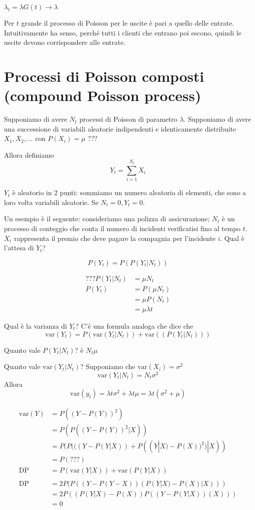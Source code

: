 \documentclass[a4paper,12pt]{book}
\begin{document}
$ \lambda_t = \lambda G(t) \to \lambda $

Per $ t $ grande il processo di Poisson per le uscite è pari a quello delle entrate. Intuitivamente ha senso, perché tutti i clienti che entrano poi escono, quindi le uscite devono corrispondere alle entrate. 

\section{Processi di Poisson composti (compound Poisson process)}
Supponiamo di avere $ N_t $ processi di Poisson di parametro $\lambda$. Supponiamo di avere una successione di variabili aleatorie indipendenti e identicamente distribuite $ X_1, X_2, ... $ con $ P(X_i) = \mu $ ??? %

Allora definiamo
$$ Y_t = \sum_{i = 1}^{N_t} X_i $$

$ Y_t $ è aleatorio in 2 punti: sommiamo un numero aleatorio di elementi, che sono a loro volta variabili aleatorie. Se $ N_t = 0, Y_t = 0 $.

Un esempio è il seguente: consideriamo una polizza di assicurazione; $ N_t $ è un processo di conteggio che conta il numero di incidenti verificatisi fino al tempo $ t $. $ X_i $ rappresenta il premio che deve pagare la compagnia per l'incidente $ i $. Qual è l'attesa di $ Y_t $?

$$ P(Y_t) = P(P(Y_t | N_t )) $$

\begin{align*}
	??? P(Y_t | N_t) & = \mu N_t \\ %
	P(Y_t) & = P(\mu N_t) \\
	& = \mu P(N_t) \\
	& = \mu \lambda t
\end{align*}

Qual è la varianza di $ Y_t $? C'è una formula analoga che dice che 
$$ \text{var} (Y_t) = P(\mathrm{var}(Y_t | N_t)) + \mathrm{var}((P(Y_t | N_t)))$$

Quanto vale $ P(Y_t | N_t ) $? è $ N_t \mu $

Quanto vale $ \mathrm{var}(Y_t | N_t) $? Supponiamo che $\mathrm{var}(X_i) = \sigma^2$
$$ \mathrm{var}(Y_t | N_t) = N_t \sigma^2 $$
Allora
$$ \mathrm{var}(y_t) = \lambda t \sigma^2 + \lambda t \mu = \lambda t (\sigma^2 + \mu) $$


\begin{align*}
	\text{var}(Y) & = P((Y-P(Y))^2) \\
	 & = P(P((Y-P(Y))^2 | X ))\\
	 & = P(P(((Y-P(Y|X)) + P((Y|X) - P(X))^2 ) | X))  \\
	 & = P(???) \\ %
	 \text{DP} & = P(\text{var}(Y|X)) + \text{var}(P(Y|X)) \\
	 \\
	 \text{DP} & = 2P(P((Y - P(Y-X)) (P(Y|X) - P(X)|X) )) \\%
	 & = 2P((P(Y|X) -P(X)) P((Y-P(Y|X)) (X)  ) ) \\ %
	 & = 0
\end{align*}
\end{document}
